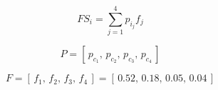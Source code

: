\begin{equation}
FS_i = \sum_{j=1}^{4} p_{i_{j}} f_j
\label{eq:func_score}
\end{equation}

\begin{equation}
P = [\,p_{c_1},\,p_{c_2},\,p_{c_3},\,p_{c_4}\,]
\label{eq:probability_vector}
\end{equation}

\begin{equation}
F = [\,f_{1},\,f_{2},\,f_{3},\,f_{4}\,] 
    = [\,0.52,\,0.18,\,0.05,\,0.04\,]
\label{eq:func_prob_vector}
\end{equation}






